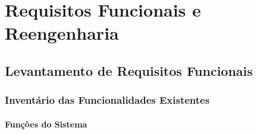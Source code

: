 \chapter{Requisitos Funcionais e Reengenharia}
\label{sec:reqfunc}

\section{Levantamento de Requisitos Funcionais}
\label{sec:levantamento}

\subsection{Inventário das Funcionalidades Existentes}
\label{subsec:inventário}

\subsubsection{Funções do Sistema}
\label{ssubsec:funcoes}

